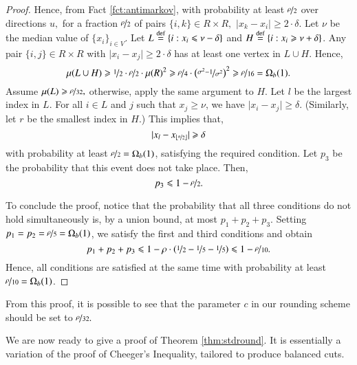 \documentclass[twoside,leqno,twocolumn]{article}
\newcommand{\nfrac}{\nicefrac}
\renewcommand{\leq}{\leqslant}
\renewcommand{\geq}{\geqslant}
\newcommand{\abs}[1]{\lvert#1\rvert}
\newcommand{\floor}[1]{\lfloor #1 \rfloor}
\newcommand{\defeq}{\stackrel{\textup{def}}{=}}
\numberwithin{equation}{section}
\begin{document}
\begin{proof}
Hence, from Fact \ref{fct:antimarkov}, with probability at least $\nfrac{\rho}{2}$ over directions $u,$ for a fraction $\nfrac{\rho}{2}$ of pairs $\{i,k\} \in R \times R,$  $\abs{x_k - x_i} \geq 2\cdot \delta.$ 
Let $\nu$ be the median value of $\{x_i\}_{i \in V}$.
Let $L \defeq \left\{i : x_i \leq \nu - \delta \right\} $ and $H \defeq \left\{i : x_i \geq \nu + \delta \right\}$. Any pair $\{i,j\} \in R \times R$ with $\abs{x_i - x_j} \geq 2\cdot \delta$ has at least one vertex in $L \cup H$. 
Hence,
$$\mu( L \cup H) \geq \nfrac{1}{2} \cdot \nfrac{\rho}{2} \cdot \mu(R)^2 \geq \nfrac{\rho}{4} \cdot\left(\nfrac{\sigma^2 - 1}{\sigma^2}\right)^2 \geq \nfrac{\rho}{16} = \Omega_b(1) .$$
Assume $\mu(L) \geq \nfrac{\rho}{32} ,$ otherwise, apply the same argument to $H$.
Let $l$ be the largest index in $L.$ 
For all $i \in L$ and $j$ such that $x_j \geq \nu$, we have $\abs{x_i - x_j} \geq \delta$. (Similarly, let $r$ be the smallest index in $H$.)
This implies that, 
$$\abs{x_{l} - x_{\floor{\nfrac{n}{2}}}} \geq \delta$$
with probability at least $\nfrac{\rho}{2} = \Omega_b(1)$, satisfying the required condition.
Let $p_3$ be the probability that this event does not take place. Then,
$$p_3 \leq 1 - \nfrac{\rho}{2} .$$

\noindent
To conclude the proof, notice that the probability that all three conditions do not hold simultaneously is, by a union bound, at most $p_1 + p_2 + p_3$. Setting $p_1 = p_2 = \nfrac{\rho}{5} = \Omega_b(1)$, we satisfy the first and third conditions and obtain
$$ p_1 + p_2 + p_3 \leq 1 - \rho\cdot \left(\nfrac{1}{2} - \nfrac{1}{5} - \nfrac{1}{5}\right)  \leq 1 - \nfrac{\rho}{10}.$$
Hence, all conditions are satisfied at the same time with probability at least $ \nfrac{\rho}{10} = \Omega_b(1)$.
\end{proof}
\noindent
From this proof, it is possible to see that the parameter $c$ in our rounding scheme should be set to $\nfrac{\rho}{32}.$


We are now ready to give a proof of Theorem \ref{thm:stdround}. It is essentially a variation of the proof of Cheeger's Inequality, tailored to produce balanced cuts.
\end{document}
